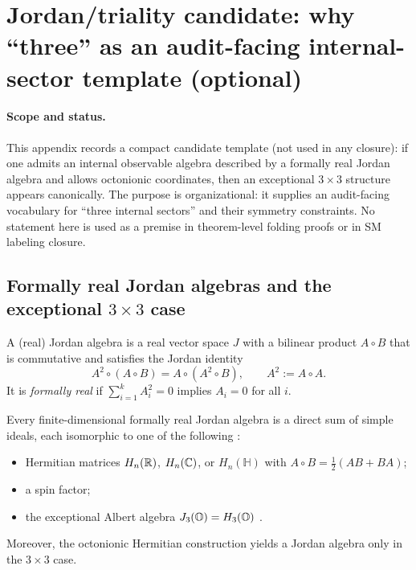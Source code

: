 \section{Jordan/triality candidate: why ``three'' as an audit-facing internal-sector template (optional)}
\label{app:jordan_triality_candidate}

\paragraph{Scope and status.}
\AuditTag This appendix records a compact candidate template (not used in any closure): if one admits an internal observable algebra described by a formally real Jordan algebra and allows octonionic coordinates, then an exceptional $3\times 3$ structure appears canonically.
The purpose is organizational: it supplies an audit-facing vocabulary for ``three internal sectors'' and their symmetry constraints.
No statement here is used as a premise in theorem-level folding proofs or in SM labeling closure.

\subsection{Formally real Jordan algebras and the exceptional $3\times 3$ case}
\label{subsec:jordan_formally_real_candidate}

\begin{definition}\label{def:jordan_formally_real_candidate}
\MathTag A (real) Jordan algebra is a real vector space $J$ with a bilinear product $A\circ B$ that is commutative and satisfies the Jordan identity
\[
A^2\circ(A\circ B)=A\circ(A^2\circ B),\qquad A^2:=A\circ A.
\]
It is \emph{formally real} if $\sum_{i=1}^k A_i^2=0$ implies $A_i=0$ for all $i$.
\end{definition}

\begin{theorem}\label{thm:jnww_candidate}
\MathTag Every finite-dimensional formally real Jordan algebra is a direct sum of simple ideals, each isomorphic to one of the following \cite{JordanVonNeumannWigner1934}:
\begin{itemize}
\item Hermitian matrices $H_n(\mathbb{R})$, $H_n(\mathbb{C})$, or $H_n(\mathbb{H})$ with $A\circ B=\tfrac12(AB+BA)$;
\item a spin factor;
\item the exceptional Albert algebra $J_3(\mathbb{O})=H_3(\mathbb{O})$ \cite{Albert1934}.
\end{itemize}
Moreover, the octonionic Hermitian construction yields a Jordan algebra only in the $3\times 3$ case.
\end{theorem}

